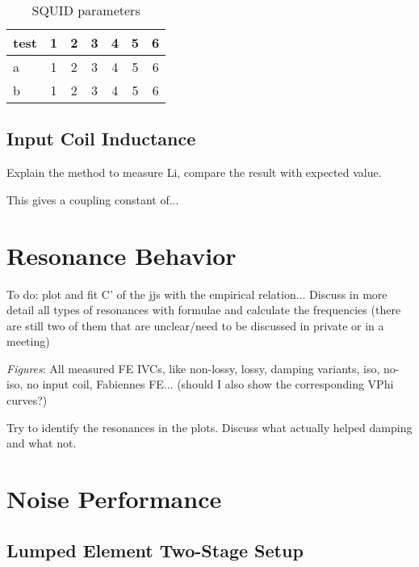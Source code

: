 
\begin{table}%
	\centering
	\begin{tabular}{l*{6}{c}}
		test & 1 & 2 & 3 & 4 & 5 & 6 \\
		\hline
		a & 1 & 2 & 3 & 4 & 5 & 6 \\
		b & 1 & 2 & 3 & 4 & 5 & 6 \\
	\end{tabular}
	\caption{SQUID parameters}
	\label{tab:SQUIDparameters}
\end{table}

\subsection{Input Coil Inductance} \label{subsec_Li}

Explain the method to measure Li, compare the result with expected value.

This gives a coupling constant of...

\section{Resonance Behavior}\label{sec_resonance_results}


To do: plot and fit C' of the jjs with the empirical relation...
Discuss in more detail all types of resonances with formulae and calculate the frequencies (there are still two of them that are unclear/need to be discussed in private or in a meeting)

\textit{Figures}: All measured FE IVCs, like non-lossy, lossy, damping variants, iso, no-iso, no input coil, Fabiennes FE... (should I also show the corresponding VPhi curves?)

Try to identify the resonances in the plots. Discuss what actually helped damping and what not. 

\section{Noise Performance}

\subsection{Lumped Element Two-Stage Setup}

